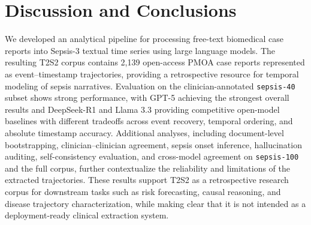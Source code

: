 \documentclass[pmlr,twocolumn,10pt]{jmlr} %
\begin{document}
\section{Discussion and Conclusions}
We developed an analytical pipeline for processing free-text biomedical case reports into Sepsis-3 textual time series using large language models. The resulting T2S2 corpus contains 2,139 open-access PMOA case reports represented as event--timestamp trajectories, providing a retrospective resource for temporal modeling of sepsis narratives. Evaluation on the clinician-annotated \texttt{sepsis-40} subset shows strong performance, with GPT-5 achieving the strongest overall results and DeepSeek-R1 and Llama 3.3 providing competitive open-model baselines with different tradeoffs across event recovery, temporal ordering, and absolute timestamp accuracy. 
Additional analyses, including document-level bootstrapping, clinician--clinician agreement, sepsis onset inference, hallucination auditing, self-consistency evaluation, and cross-model agreement on \texttt{sepsis-100} and the full corpus, further contextualize the reliability and limitations of the extracted trajectories.
These results support T2S2 as a retrospective research corpus for downstream tasks such as risk forecasting, causal reasoning, and disease trajectory characterization, while making clear that it is not intended as a deployment-ready clinical extraction system.
\end{document}
